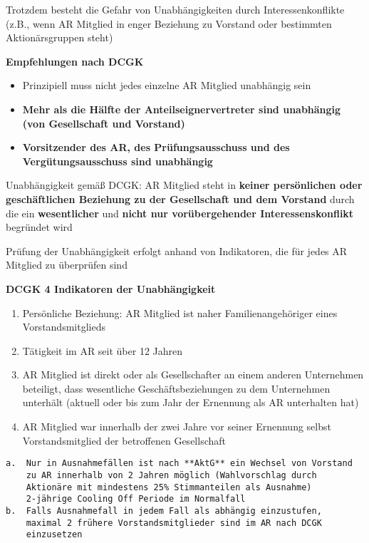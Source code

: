 \documentclass[
]{article}
\providecommand{\tightlist}{%
  \setlength{\itemsep}{0pt}\setlength{\parskip}{0pt}}
\begin{document}
Trotzdem besteht die Gefahr von Unabhängigkeiten durch
Interessenkonflikte (z.B., wenn AR Mitglied in enger Beziehung zu
Vorstand oder bestimmten Aktionärsgruppen steht)

\textbf{Empfehlungen nach DCGK}

\begin{itemize}
\tightlist
\item
  Prinzipiell muss nicht jedes einzelne AR Mitglied unabhängig sein
\item
  \textbf{Mehr als die Hälfte der Anteilseignervertreter sind unabhängig
  (von Gesellschaft und Vorstand)}
\item
  \textbf{Vorsitzender des AR, des Prüfungsausschuss und des
  Vergütungsausschuss sind unabhängig}
\end{itemize}

Unabhängigkeit gemäß DCGK: AR Mitglied steht in \textbf{keiner
persönlichen oder geschäftlichen Beziehung zu der Gesellschaft und dem
Vorstand} durch die ein \textbf{wesentlicher} und \textbf{nicht nur
vorübergehender Interessenskonflikt} begründet wird

Prüfung der Unabhängigkeit erfolgt anhand von Indikatoren, die für jedes
AR Mitglied zu überprüfen sind

\textbf{DCGK 4 Indikatoren der Unabhängigkeit}

\begin{enumerate}
\def\labelenumi{\arabic{enumi}.}
\item
  Persönliche Beziehung: AR Mitglied ist naher Familienangehöriger eines
  Vorstandsmitglieds
\item
  Tätigkeit im AR seit über 12 Jahren
\item
  AR Mitglied ist direkt oder als Gesellschafter an einem anderen
  Unternehmen beteiligt, dass wesentliche Geschäftsbeziehungen zu dem
  Unternehmen unterhält (aktuell oder bis zum Jahr der Ernennung als AR
  unterhalten hat)
\item
  AR Mitglied war innerhalb der zwei Jahre vor seiner Ernennung selbst
  Vorstandsmitglied der betroffenen Gesellschaft
\end{enumerate}

\begin{verbatim}
a.  Nur in Ausnahmefällen ist nach **AktG** ein Wechsel von Vorstand
    zu AR innerhalb von 2 Jahren möglich (Wahlvorschlag durch
    Aktionäre mit mindestens 25% Stimmanteilen als Ausnahme)  
    2-jährige Cooling Off Periode im Normalfall
b.  Falls Ausnahmefall in jedem Fall als abhängig einzustufen,
    maximal 2 frühere Vorstandsmitglieder sind im AR nach DCGK
    einzusetzen
\end{verbatim}
\end{document}
